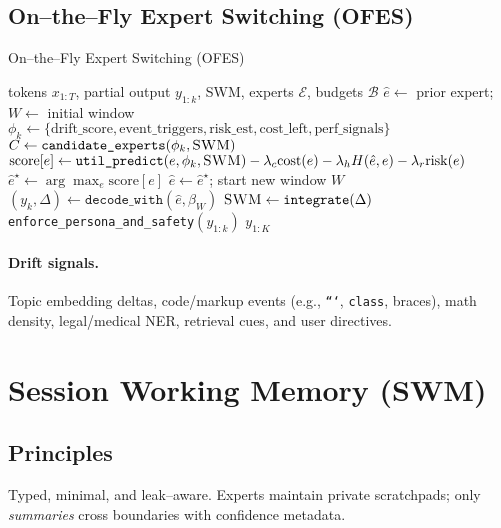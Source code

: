 \documentclass[11pt]{article}
\newcommand{\SWM}{\textsc{SWM}}
\begin{document}
\subsection{On--the--Fly Expert Switching (OFES)}
\begin{algorithm}[h]
\caption{On--the--Fly Expert Switching (OFES)}
\label{alg:ofes}
\begin{algorithmic}[1]
\Require tokens $x_{1:T}$, partial output $y_{1:k}$, \SWM, experts $\mathcal{E}$, budgets $\mathcal{B}$
\State $\hat{e} \gets$ prior expert; $W \gets$ initial window
    \State $\phi_k \gets \{\text{drift\_score}, \text{event\_triggers}, \text{risk\_est}, \text{cost\_left}, \text{perf\_signals}\}$
        \State $C \gets \texttt{candidate\_experts}(\phi_k,\SWM)$
            \State $\mathrm{score}[e] \gets \texttt{util\_predict}(e,\phi_k,\SWM) - \lambda_c \mathrm{cost}(e) - \lambda_h H(\hat{e},e) - \lambda_r \mathrm{risk}(e)$
        \EndFor
        \State $\hat{e}^\star \gets \arg\max_{e} \mathrm{score}[e]$
            \State $\hat{e} \gets \hat{e}^\star$; start new window $W$
        \EndIf
    \EndIf
    \State $(y_k, \Delta) \gets \texttt{decode\_with}(\hat{e}, \beta_W)$ 
    \State $\SWM \gets \texttt{integrate}(\Delta)$ 
    \State \texttt{enforce\_persona\_and\_safety}$(y_{1:k})$
\EndFor
\State \Return $y_{1:K}$
\end{algorithmic}
\end{algorithm}

\paragraph{Drift signals.} Topic embedding deltas, code/markup events (e.g., \texttt{```}, \texttt{class}, braces), math density, legal/medical NER, retrieval cues, and user directives.

\section{Session Working Memory (\SWM)}
\subsection{Principles}
Typed, minimal, and leak--aware. Experts maintain private scratchpads; only \emph{summaries} cross boundaries with confidence metadata.
\end{document}
